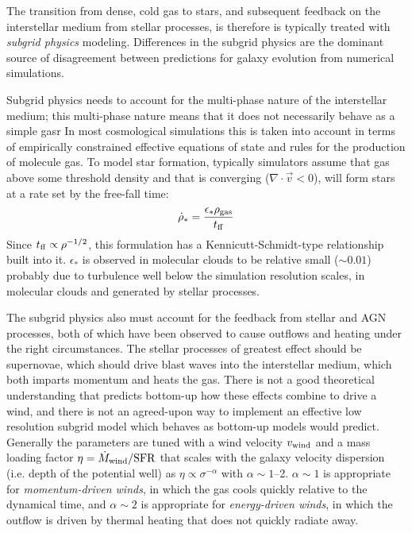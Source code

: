 The transition from dense, cold gas to stars, and subsequent feedback
on the interstellar medium from stellar processes, is therefore is
typically treated with {\it subgrid physics} modeling. Differences in
the subgrid physics are the dominant source of disagreement between
predictions for galaxy evolution from numerical simulations.

Subgrid physics needs to account for the multi-phase nature of the
interstellar medium; this multi-phase nature means that it does not
necessarily behave as a simple gasr In most cosmological simulations
this is taken into account in terms of empirically constrained
effective equations of state and rules for the production of molecule
gas.  To model star formation, typically simulators assume that gas
above some threshold density and that is converging
($\nabla\cdot\vec{v} < 0$), will form stars at a rate set by the
free-fall time:
\begin{equation}
\dot\rho_\ast = \frac{\epsilon_\ast \rho_{\rm gas}}{t_{\rm ff}}
\end{equation}
Since $t_{\rm ff} \propto \rho^{-1/2}$, this formulation has a
Kennicutt-Schmidt-type relationship built into it. $\epsilon_\ast$ is
observed in molecular clouds to be relative small ($\sim 0.01$)
probably due to turbulence well below the simulation resolution
scales, in molecular clouds and generated by stellar processes.

The subgrid physics also must account for the feedback from stellar
and AGN processes, both of which have been observed to cause outflows
and heating under the right circumstances. The stellar processes of
greatest effect should be supernovae, which should drive blast waves
into the interstellar medium, which both imparts momentum and heats
the gas. There is not a good theoretical understanding that predicts
bottom-up how these effects combine to drive a wind, and there is not
an agreed-upon way to implement an effective low resolution subgrid
model which behaves as bottom-up models would predict. Generally the
parameters are tuned with a wind velocity $v_{\rm wind}$ and a mass
loading factor $\eta = \dot M_{\rm wind}/{\rm SFR}$ that scales with
the galaxy velocity dispersion (i.e. depth of the potential well) as
$\eta\propto \sigma^{-\alpha}$ with $\alpha \sim 1$--2. $\alpha\sim 1$
is appropriate for {\it momentum-driven winds}, in which the gas cools
quickly relative to the dynamical time, and $\alpha\sim 2$ is
appropriate for {\it energy-driven winds}, in which the outflow is
driven by thermal heating that does not quickly radiate away.

